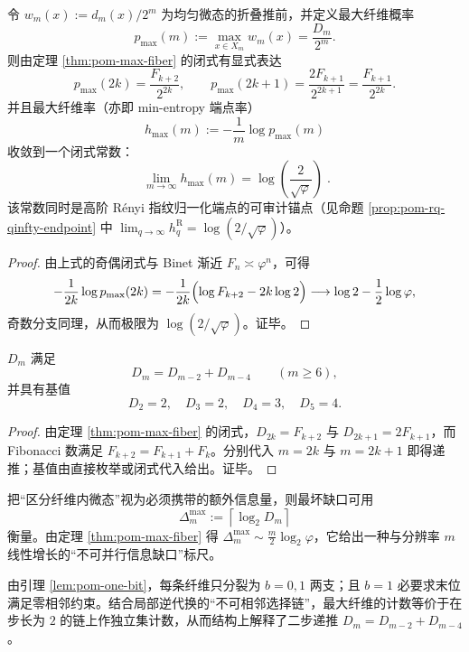 \begin{corollary}[最大纤维概率端点与可审计极限常数]\label{cor:pom-max-fiber-rate-endpoint}
令 \(w_m(x):=d_m(x)/2^m\) 为均匀微态的折叠推前，并定义最大纤维概率
\[
p_{\max}(m):=\max_{x\in X_m}w_m(x)=\frac{D_m}{2^m}.
\]
则由定理 \ref{thm:pom-max-fiber} 的闭式有显式表达
\[
p_{\max}(2k)=\frac{F_{k+2}}{2^{2k}},
\qquad
p_{\max}(2k+1)=\frac{2F_{k+1}}{2^{2k+1}}=\frac{F_{k+1}}{2^{2k}}.
\]
并且最大纤维率（亦即 min-entropy 端点率）
\[
h_{\max}(m):=-\frac{1}{m}\log p_{\max}(m)
\]
收敛到一个闭式常数：
\[
\boxed{\;
\lim_{m\to\infty}h_{\max}(m)=\log\!\left(\frac{2}{\sqrt{\varphi}}\right)\; }.
\]
该常数同时是高阶 Rényi 指纹归一化端点的可审计锚点（见命题 \ref{prop:pom-rq-qinfty-endpoint} 中 \(\lim_{q\to\infty}h_q^{\mathrm R}=\log(2/\sqrt{\varphi})\)）。
\end{corollary}
\begin{proof}
由上式的奇偶闭式与 Binet 渐近 \(F_n\asymp \varphi^n\)，可得
\[
-\frac{1}{2k}\log p_{\max}(2k)
=-\frac{1}{2k}\Bigl(\log F_{k+2}-2k\log 2\Bigr)
\longrightarrow \log 2-\frac12\log\varphi,
\]
奇数分支同理，从而极限为 \(\log(2/\sqrt{\varphi})\)。证毕。
\end{proof}

\begin{corollary}[二步递推与基值]\label{cor:pom-D-rec}
$D_m$ 满足
\[
D_m=D_{m-2}+D_{m-4}\qquad(m\ge 6),
\]
并具有基值
\[
D_2=2,\quad D_3=2,\quad D_4=3,\quad D_5=4.
\]
\end{corollary}
\begin{proof}
由定理 \ref{thm:pom-max-fiber} 的闭式，$D_{2k}=F_{k+2}$ 与 $D_{2k+1}=2F_{k+1}$，而 Fibonacci 数满足 $F_{k+2}=F_{k+1}+F_k$。分别代入 $m=2k$ 与 $m=2k+1$ 即得递推；基值由直接枚举或闭式代入给出。证毕。
\end{proof}

\begin{remark}[最坏投影缺口的比特量化]\label{rem:pom-D-delay}
把“区分纤维内微态”视为必须携带的额外信息量，则最坏缺口可用
\[
\Delta_m^{\max}:=\left\lceil \log_2 D_m\right\rceil
\]
衡量。由定理 \ref{thm:pom-max-fiber} 得
\(
\Delta_m^{\max}\sim \frac{m}{2}\log_2\varphi
\)，它给出一种与分辨率 $m$ 线性增长的“不可并行信息缺口”标尺。
\end{remark}

\begin{remark}[一比特溢出与二步递推的结构来源]\label{rem:pom-overflow-rec}
由引理 \ref{lem:pom-one-bit}，每条纤维只分裂为 $b=0,1$ 两支；且 $b=1$ 必要求末位满足零相邻约束。结合局部逆代换的“不可相邻选择链”，最大纤维的计数等价于在步长为 $2$ 的链上作独立集计数，从而结构上解释了二步递推 $D_m=D_{m-2}+D_{m-4}$。
\end{remark}

